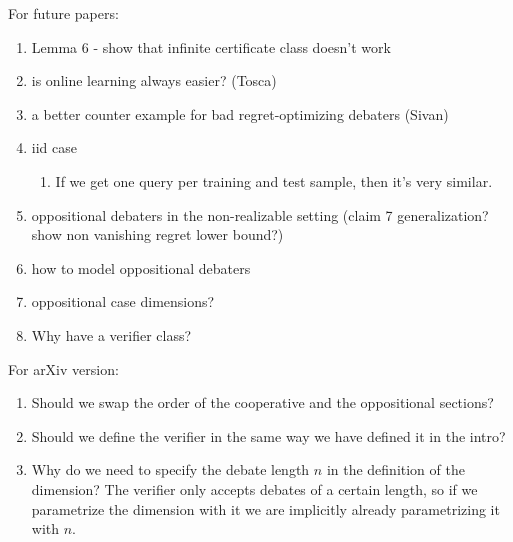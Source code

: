 \documentclass[11pt]{article}
\begin{document}
For future papers:
\begin{enumerate}
    \item Lemma 6 - show that infinite certificate class doesn't work
    \item is online learning always easier? (Tosca)
    \item a better counter example for bad regret-optimizing debaters (Sivan)
    \item iid case
    \begin{enumerate}
        \item If we get one query per training and test sample, then it's very similar.
    \end{enumerate}
    \item oppositional debaters in the non-realizable setting (claim 7 generalization? show non vanishing regret lower bound?)
    \item how to model oppositional debaters
    \item oppositional case dimensions?
    \item Why have a verifier class?
\end{enumerate}

For arXiv version:
\begin{enumerate}
    \item Should we swap the order of the cooperative and the oppositional sections?
    \item Should we define the verifier in the same way we have defined it in the intro?
    \item Why do we need to specify the debate length $n$ in the definition of the dimension? The verifier only accepts debates of a certain length, so if we parametrize the dimension with it we are implicitly already parametrizing it with $n$.
\end{enumerate}
\end{document}
